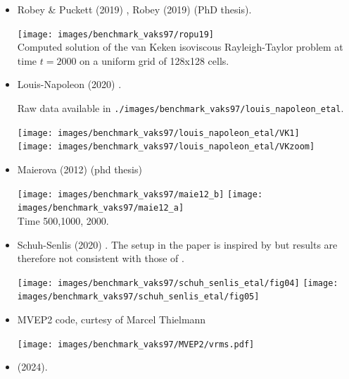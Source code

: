 \begin{itemize}
\item Robey \& Puckett (2019) \cite{ropu19}, Robey (2019) \cite{robe19} (PhD thesis).

\begin{center}
\texttt{[image: images/benchmark\_vaks97/ropu19]}\\
{\captionfont Computed solution of the van Keken isoviscous Rayleigh-Taylor problem
at time $t = 2000$ on a uniform grid of 128x128 cells. }
\end{center}



\item Louis-Napoleon \etal (2020) \cite{logb20}.

Raw data available in {\tt ./images/benchmark\_vaks97/louis\_napoleon\_etal}.

\begin{center}
\texttt{[image: images/benchmark\_vaks97/louis\_napoleon\_etal/VK1]}\\
\texttt{[image: images/benchmark\_vaks97/louis\_napoleon\_etal/VKzoom]}
\end{center}

\item Maierova (2012) \cite{maie12} (phd thesis)

\begin{center}
\texttt{[image: images/benchmark\_vaks97/maie12\_b]}
\texttt{[image: images/benchmark\_vaks97/maie12\_a]}\\
{\captionfont Time 500,1000, 2000.}
\end{center}


\item Schuh-Senlis \etal (2020) \cite{sctc20}. The setup in the paper is inspired 
by \cite{vaks97} but results are therefore not consistent with those of \cite{vaks97}.

\begin{center}
\texttt{[image: images/benchmark\_vaks97/schuh\_senlis\_etal/fig04]}
\texttt{[image: images/benchmark\_vaks97/schuh\_senlis\_etal/fig05]}
\end{center}

\item MVEP2 code, curtesy of Marcel Thielmann 

\begin{center}
\texttt{[image: images/benchmark\_vaks97/MVEP2/vrms.pdf]}
\end{center}

\item \textcite{buoa24} (2024).


\end{itemize}
